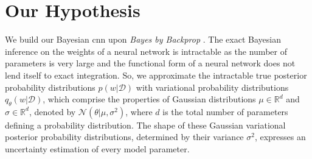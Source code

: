 \section{Our Hypothesis}
\newline We build our Bayesian \ac{cnn} upon \textit{Bayes by Backprop} \cite{graves2011practical,blundell2015weight}. The exact Bayesian inference on the weights of a neural network is intractable as the number of parameters is very large and the functional form of a neural network does not lend itself to exact integration. So, we approximate the intractable true posterior probability distributions $p(w|\mathcal{D})$ with variational probability distributions $q_{\theta}(w|\mathcal{D})$, which comprise the properties of Gaussian distributions $\mu \in \mathbb{R}^d$ and $\sigma \in \mathbb{R}^d$, denoted by $\mathcal{N}(\theta|\mu, \sigma^2)$, where $d$ is the total number of parameters defining a probability distribution. The shape of these Gaussian variational posterior probability distributions, determined by their variance $\sigma^2$, expresses an uncertainty estimation of every model parameter. \\ \\



